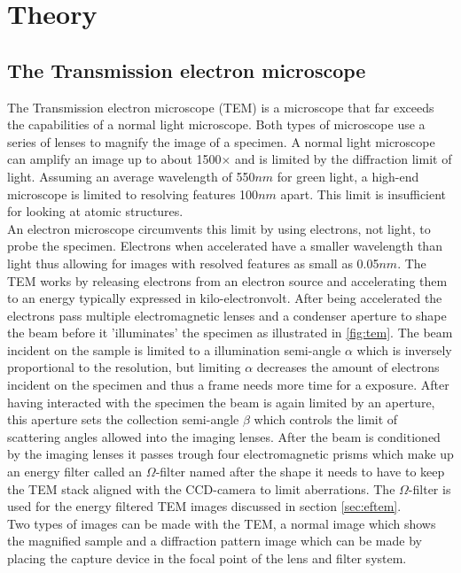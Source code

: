 \section{Theory}
\label{chap:theory}
\subsection{The Transmission electron microscope}
The Transmission electron microscope (TEM) is a microscope that far exceeds the capabilities of a normal light microscope. Both types of microscope use a series of lenses to magnify the image of a specimen.
A normal light microscope can amplify an image up to about 1500$\times$ and is limited by the diffraction limit of light. Assuming an average wavelength of 550$nm$ for green light, a high-end microscope is limited to resolving features 100$nm$ apart.
This limit is insufficient for looking at atomic structures.\cite{PhysRevLett.106.193905}\\
An electron microscope circumvents this limit by using electrons, not light, to probe the specimen. Electrons when accelerated have a smaller wavelength than light thus allowing for images with resolved features as small as 0.05$nm$. \cite{kisielowski_freitag_bischoff_van}
The TEM works by releasing electrons from an electron source and accelerating them to an energy typically expressed in kilo-electronvolt. After being accelerated the electrons pass multiple electromagnetic lenses and a condenser aperture to shape the beam before it 'illuminates' the specimen as illustrated in \ref{fig:tem}.
The beam incident on the sample is limited to a illumination semi-angle $\alpha$ which is inversely proportional to the resolution, but limiting $\alpha$ decreases the amount of electrons incident on the specimen and thus a frame needs more time for a exposure.
After having interacted with the specimen the beam is again limited by an aperture, this aperture sets the collection semi-angle $\beta$ which controls the limit of scattering angles allowed into the imaging lenses.
After the beam is conditioned by the imaging lenses it passes trough four electromagnetic prisms which make up an energy filter called an $\Omega$-filter named after the shape it needs to have to keep the TEM stack aligned with the CCD-camera to limit aberrations.
The $\Omega$-filter is used for the energy filtered TEM images discussed in section \ref{sec:eftem}.\\
Two types of images can be made with the TEM, a normal image which shows the magnified sample and a diffraction pattern image which can be made by placing the capture device in the focal point of the lens and filter system.

